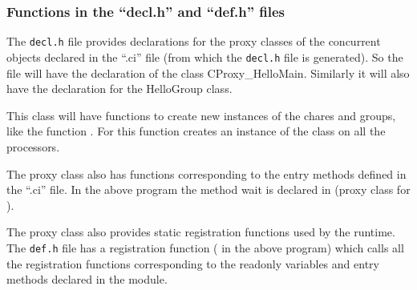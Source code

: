 {\subsubsection{Functions in the ``decl.h'' and ``def.h'' files}

The \texttt{decl.h} file provides declarations for the proxy classes of the
concurrent objects declared in the ``.ci'' file (from which the \texttt{decl.h}
file is generated). So the  file will have the declaration of
the class CProxy\_HelloMain. Similarly it will also have the declaration for
the HelloGroup class. 

This class will have functions to create new instances of the chares and
groups, like the function . For  this function creates
an instance of the class  on all the processors. 

The proxy class also has functions corresponding to the entry methods defined
in the ``.ci'' file. In the above program the method wait is declared in
 (proxy class for ).

The proxy class also provides static registration functions used by the
\charmpp{} runtime.  The \texttt{def.h} file has a registration function
( in the above program) which calls all the registration
functions corresponding to the readonly variables and entry methods declared in
the module.
} %

